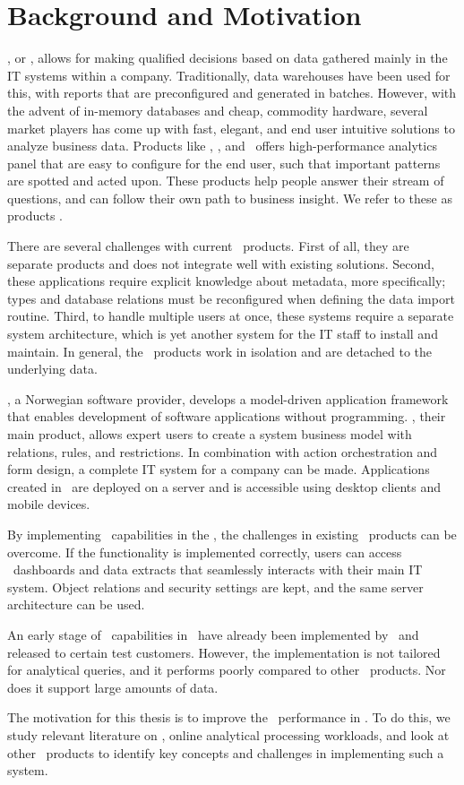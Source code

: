 \section{Background and Motivation}
\label{sec:background-and-motivation}

\bi, or \ba, allows for making qualified decisions based on data gathered mainly in the IT systems within a company. Traditionally, data warehouses have been used for this, with reports that are preconfigured and generated in batches. However, with the advent of in-memory databases and cheap, commodity hardware, several market players has come up with fast, elegant, and end user intuitive solutions to analyze business data. Products like \qlikview, \tableau, and \powerpivot~offers high-performance analytics panel that are easy to configure for the end user, such that important patterns are spotted and acted upon. These products help people answer their stream of questions, and can follow their own path to business insight. We refer to these as  products \cite{Qlik2014-vd}.

There are several challenges with current \bd~products. First of all, they are separate products and does not integrate well with existing solutions. Second, these applications require explicit knowledge about metadata, more specifically; types and database relations must be reconfigured when defining the data import routine.  Third, to handle multiple users at once, these systems require a separate system architecture, which is yet another system for the IT staff to install and maintain. In general, the \bd~products work in isolation and are detached to the underlying data.

\genus, a Norwegian software provider, develops a model-driven application framework that enables development of software applications without programming. \genusSoftware, their main product, allows expert users to create a system business model with relations, rules, and restrictions. In combination with action orchestration and form design, a complete IT system for a company can be made. Applications created in \genusSoftware~are deployed on a server and is accessible using desktop clients and mobile devices.

By implementing \bd~capabilities in the \genusSoftware, the challenges in existing \bd~products can be overcome. If the functionality is implemented correctly, users can access \bd~dashboards and data extracts that seamlessly interacts with their main IT system. Object relations and security settings are kept, and the same server architecture can be used. 

An early stage of \bd~capabilities in \genusSoftware~have already been implemented by \genus~and released to certain test customers. However, the implementation is not tailored for analytical queries, and it performs poorly compared to other \bd~products. Nor does it support large amounts of data. 

The motivation for this thesis is to improve the \bd~performance in \genusSoftware. To do this, we study relevant literature on \bi, online analytical processing workloads, and look at other \bd~products to identify key concepts and challenges in implementing such a system. 
